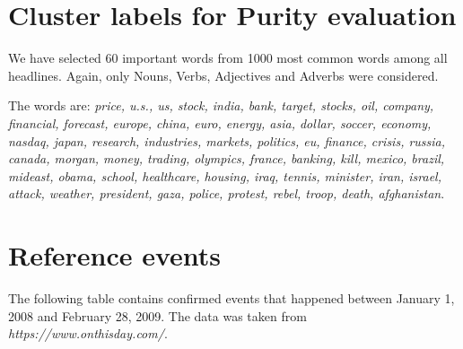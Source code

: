 \documentclass[a4paper]{article}
\begin{document}
\appendix

\section{Cluster labels for Purity evaluation} \label{cluster-labels}
We have selected 60 important words from 1000 most common words among all headlines. Again, only Nouns, Verbs, Adjectives and Adverbs were considered.

The words are: \textit{price, u.s., us, stock, india, bank, target, stocks, oil, company, financial, forecast, europe, china, euro, energy, asia, dollar, soccer, economy, nasdaq, japan, research, industries, markets, politics, eu, finance, crisis, russia, canada, morgan, money, trading, olympics, france, banking, kill, mexico, brazil, mideast, obama, school, healthcare, housing, iraq, tennis, minister, iran, israel, attack, weather, president, gaza, police, protest, rebel, troop, death, afghanistan}.

\section{Reference events}
The following table contains confirmed events that happened between January 1, 2008 and February 28, 2009. The data was taken from \textit{https://www.onthisday.com/}.
\end{document}
